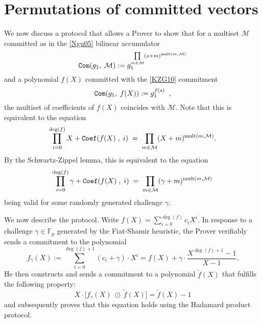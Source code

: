 \documentclass[11pt, lettersize, notitlepage, leqno, footskip=0.6cm]{article}
\newcommand{\bFp}{\mathbb{F}_p}
\newcommand{\wti}{\widetilde}
\newcommand{\mc}{\mathcal}
\newcommand{\mr}{\mathrm}
\newcommand{\vs}{\vspace{-0.15cm}}
\numberwithin{equation}{section}
\begin{document}
\section{\fontsize{11}{11}\selectfont Permutations of committed vectors}

We now discuss a protocol that allows a Prover to show that for a multiset $\mc{M}$ committed as in the \hyperlink{Ngu}{[Ngu05]} bilinear accumulator \vs $$ {\tt{Com}}(g_1,\;\mc{M}):= g_1^{\prod\limits_{m\in\mc{M}} (s+m)^{\mr{mult}(m,\mc{M})}}  $$ and a polynomial $f(X)$ committed with the \hyperlink{KZG}{[KZG10]} commitment \vs $${\tt{Com}}(g_1,\;f(X)):= g_1^{f(s)}\;\;,$$ the multiset of coefficients of $f(X)$ coincides with $\mc{M}$. Note that this is equivalent to the equation \vs $$ \prod\limits_{i=0}^{\deg(f)} X+{\tt{Coef}}(f(X)\;,\;i)  \; = \;   \prod\limits_{m\in\mc{M}}  (X+m)^{\mr{mult}(m,\mc{M})}. $$ By the Schwartz-Zippel lemma, this is equivalent to the equation \vs $$ \prod\limits_{i=0}^{\deg(f)} \gamma+{\tt{Coef}}(f(X)\;,\; i)  \; = \;   \prod\limits_{m\in\mc{M}}  (\gamma+m)^{\mr{mult}(m,\mc{M})} $$ being valid for some randomly generated challenge $\gamma$.


We now describe the protocol. Write $f(X) = \sum\limits_{i=0}^{\deg(f)} c_iX^i$. In response to a challenge $\gamma\in \bFp$ generated by the Fiat-Shamir heuristic, the Prover verifiably sends a commitment to the polynomial \vs $$f_{\gamma}(X):= \sum\limits_{i=0}^{\deg(f)+1} (c_i+\gamma)\cdot X^i = f(X) + \gamma\cdot \frac{X^{\deg(f)+1}-1}{X-1} . $$ He then constructs and sends a commitment to a polynomial $\wti{f}(X)$ that fulfills the following property: $$ X\cdot \big[f_{\gamma}(X) \;\odot\; \wti{f}(X) \big]  = \wti{f}(X) - 1  $$ and subsequently proves that this equation holds using the Hadamard product protocol.

\begin{comment}

We now describe the protocol. Write $f(X) = \sum\limits_{i=0}^{\deg(f)} c_iX^i$. In response to a challenge $\gamma\in \bFp$ generated by the Fiat-Shamir heuristic, the Prover verifiably sends a commitment to the polynomial \vs $$f_{\gamma}(X):= \sum\limits_{i=0}^{\deg(f)+1} (c_i+\gamma)\cdot X^i = f(X) + \gamma\cdot \frac{X^{|{\tt{CRS}}|}-1}{X-1} . $$ He then constructs and sends a commitment to a polynomial $\wti{f}(X)$ that fulfills the following property: $$ X\cdot \big[f_{\gamma}(X) \;\odot\; \wti{f}(X) \big]  = \wti{f}(X) - 1  $$ and subsequently proves that this equation holds using the Hadamard product protocol.

\end{comment}
\end{document}
